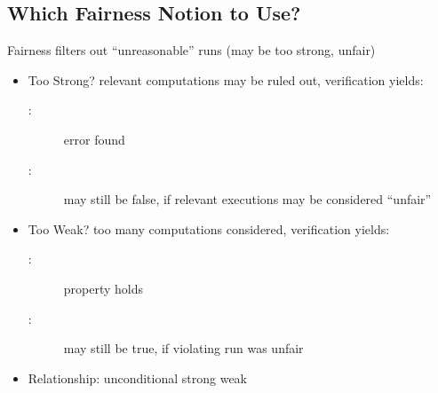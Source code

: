 \documentclass[a4paper, 10pt]{article}
\begin{document}
\subsection*{Which Fairness Notion to Use?}
Fairness filters out ``unreasonable'' runs (may be too strong, unfair)
\begin{itemize}
    \item Too Strong? \follows relevant computations may be ruled out, verification yields:
    \begin{description}
        \item[:] error found
        \item[:] may still be false, if relevant executions may be considered ``unfair''
    \end{description}
    \item Too Weak? \follows too many computations considered, verification yields:
    \begin{description}
        \item[:] property holds
        \item[:] may still be true, if violating run was unfair
    \end{description}
    \item Relationship: unconditional \follows strong \follows weak
\end{itemize}
\end{document}
